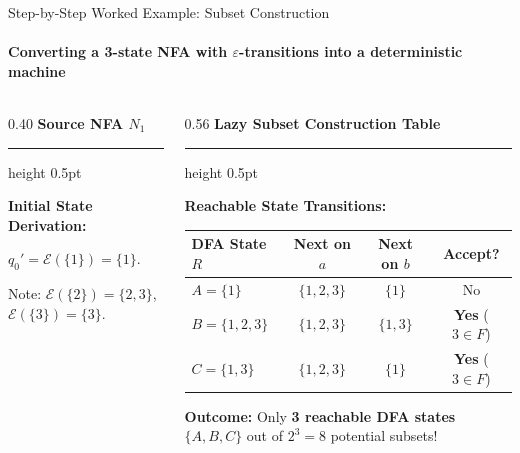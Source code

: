 \documentclass[aspectratio=169, 10pt]{beamer}
\newcommand{\colheader}[1]{%
  {\noindent\footnotesize\bfseries\color{gimpanavy}#1}%
  \vspace{0.02cm}%
  {\color{gimpanavy!30}\hrule height 0.5pt}%
  \vspace{0.05cm}%
}
\newcommand{\cardtitle}[1]{{\noindent\footnotesize\bfseries\color{gimpanavy}#1}\par\vspace{0.03cm}}
\newcommand{\greentitle}[1]{{\noindent\footnotesize\bfseries\color{accentGreen}#1}\par\vspace{0.03cm}}
\begin{document}
\begin{frame}{Step-by-Step Worked Example: Subset Construction}
  \framesubtitle{Converting a 3-state NFA with $\varepsilon$-transitions into a deterministic machine}
  
  \begin{columns}[T]
    \begin{column}{0.40\textwidth}
      \colheader{Source NFA $N_1$}
      \begin{center}
      \end{center}
      \begin{tcolorbox}[conceptcard]
        \cardtitle{Initial State Derivation:}
        {\scriptsize
        $q_0' = \mathcal{E}(\{1\}) = \{1\}$.\par
        Note: $\mathcal{E}(\{2\}) = \{2, 3\}$, \quad $\mathcal{E}(\{3\}) = \{3\}$.
        }
      \end{tcolorbox}
    \end{column}
    
    \begin{column}{0.56\textwidth}
      \colheader{Lazy Subset Construction Table}
      \begin{tcolorbox}[examplecard]
        \greentitle{Reachable State Transitions:}
        \vspace{0.02cm}
        {\scriptsize
        \begin{tabular}{@{} l c c c @{}}
          \toprule
          \textbf{DFA State $R$} & \textbf{Next on $a$} & \textbf{Next on $b$} & \textbf{Accept?} \\
          \midrule
          $A = \{1\}$ & $\{1, 2, 3\}$ & $\{1\}$ & No \\
          $B = \{1, 2, 3\}$ & $\{1, 2, 3\}$ & $\{1, 3\}$ & \textbf{Yes} ($3 \in F$) \\
          $C = \{1, 3\}$ & $\{1, 2, 3\}$ & $\{1\}$ & \textbf{Yes} ($3 \in F$) \\
          \bottomrule
        \end{tabular}
        }\par\vspace{0.06cm}
        {\scriptsize
        \textbf{Outcome:} Only \textbf{3 reachable DFA states} $\{A, B, C\}$ out of $2^3 = 8$ potential subsets!
        }
      \end{tcolorbox}
    \end{column}
  \end{columns}
  

\end{frame}
\end{document}
